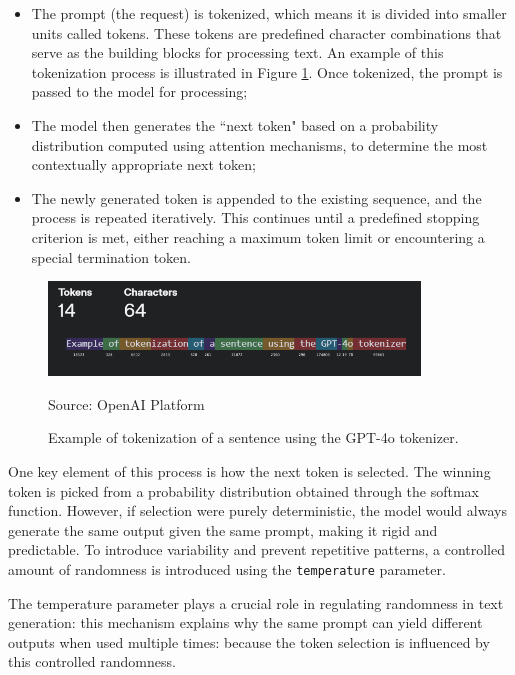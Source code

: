 \begin{itemize}
  \item The prompt (the request) is tokenized, which means it is divided into
    smaller units called tokens. These tokens are predefined character combinations
    that serve as the building blocks for processing text. An example of this
    tokenization process is illustrated in Figure \ref{fig:tokenization_example}.
    Once tokenized, the prompt is passed to the model for processing;

  \item The model then generates the ``next token" based on a probability
    distribution computed using attention mechanisms, to determine the most contextually
    appropriate next token;

  \item The newly generated token is appended to the existing sequence, and the
    process is repeated iteratively. This continues until a predefined stopping criterion
    is met, either reaching a maximum token limit or encountering a special
    termination token.
\end{itemize}

\begin{figure}[h!]
  \centering
  \includegraphics[width=0.88\textwidth]{images/tokenization_example.png}
  \caption{Example of tokenization of a sentence using the GPT-4o tokenizer.}
  { Source: OpenAI Platform\footnotemark} \label{fig:tokenization_example}
\end{figure}

One key element of this process is how the next token is selected. The winning
token is picked from a probability distribution obtained through the softmax
function. However, if selection were purely deterministic, the model would always
generate the same output given the same prompt, making it rigid and predictable.
To introduce variability and prevent repetitive patterns, a controlled amount of
randomness is introduced using the \texttt{temperature} parameter.

The temperature parameter plays a crucial role in regulating randomness in text generation:
this mechanism explains why the same prompt can yield different outputs when
used multiple times: because the token selection is influenced by this controlled
randomness.

